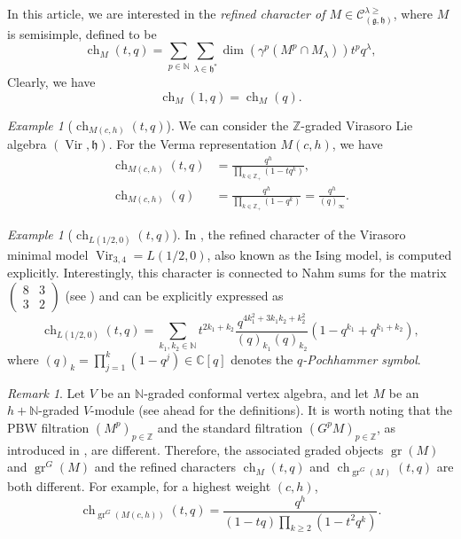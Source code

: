 \documentclass[a4paper, 12pt, reqno]{amsart}
\theoremstyle{remark}
\newtheorem{remark}[theorem]{Remark}
\newtheorem{example}[theorem]{Example}
\DeclareMathOperator{\Vir}{Vir}
\DeclareMathOperator{\ch}{ch}
\DeclareMathOperator{\gr}{gr}
\begin{document}
In this article, we are interested in the \emph{refined character of $M \in \mathcal{C}^{\lambda \ge}_{(\mathfrak{g}, \mathfrak{h})}$}, where $M$ is semisimple, defined to be
\begin{equation*}
  \ch_M(t, q) = \sum_{p \in \mathbb{N}}\sum_{\lambda \in \mathfrak{h}^*}\dim(\gamma^p(M^p \cap M_{\lambda}))t^pq^{\lambda},
\end{equation*}
Clearly, we have
\begin{equation*}
  \ch_M(1, q) = \ch_M(q).
\end{equation*}

\begin{example}[$\ch_{M(c, h)}(t, q)$]
  \label{exa:5}
  We can consider the $\mathbb{Z}$-graded Virasoro Lie algebra $(\Vir, \mathfrak{h})$.
  For the Verma representation $M(c, h)$, we have
  \begin{align*}
    \ch_{M(c, h)}(t, q) &= \frac{q^h}{\prod_{k \in \mathbb{Z}_+}(1 - tq^k)}, \\
    \ch_{M(c, h)}(q) &= \frac{q^h}{\prod_{k \in \mathbb{Z}_+}(1 - q^k)} = \frac{q^h}{(q)_{\infty}}.
  \end{align*}
\end{example}

\begin{example}[$\ch_{L(1/2, 0)}(t, q)$]
  \label{exa:6}
  In \cite{andrews_singular_2022}, the refined character of the Virasoro minimal model $\Vir_{3, 4} = L(1/2, 0)$, also known as the Ising model, is computed explicitly.
  Interestingly, this character is connected to Nahm sums for the matrix $\left(\begin{smallmatrix} 8 & 3 \\ 3 & 2 \end{smallmatrix}\right)$ (see \cite{Nahm2007}) and can be explicitly expressed as
  \begin{equation*}
    \ch_{L(1/2, 0)}(t, q) = \sum_{k_1, k_2 \in \mathbb{N}}t^{2k_1 + k_2}\frac{q^{4k_1^2 + 3k_1k_2 + k_2^2}}{(q)_{k_1}(q)_{k_2}}(1 - q^{k_1} + q^{k_1 + k_2}),
  \end{equation*}
  where $(q)_k = \prod_{j = 1}^k(1 - q^j) \in \mathbb{C}[q]$ denotes the \emph{$q$-Pochhammer symbol}.
\end{example}

\begin{remark}
  \label{rmk:3}
  Let $V$ be an $\mathbb{N}$-graded conformal vertex algebra, and let $M$ be an $h + \mathbb{N}$-graded $V$-module (see  ahead for the definitions).
  It is worth noting that the PBW filtration $(M^p)_{p \in \mathbb{Z}}$ and the standard filtration $(G^pM)_{p \in \mathbb{Z}}$, as introduced in \cite{salazar_pbw_2024}, are different.
  Therefore, the associated graded objects $\gr(M)$ and $\gr^G(M)$ and the refined characters $\ch_M(t, q)$ and $\ch_{\gr^G(M)}(t, q)$ are both different.
  For example, for a highest weight $(c, h)$,
  \begin{equation*}
    \ch_{\gr^G(M(c, h))}(t, q) = \frac{q^h}{(1 - tq)\prod_{k \ge 2}(1 - t^2q^k)}.
  \end{equation*}
\end{remark}
\end{document}
